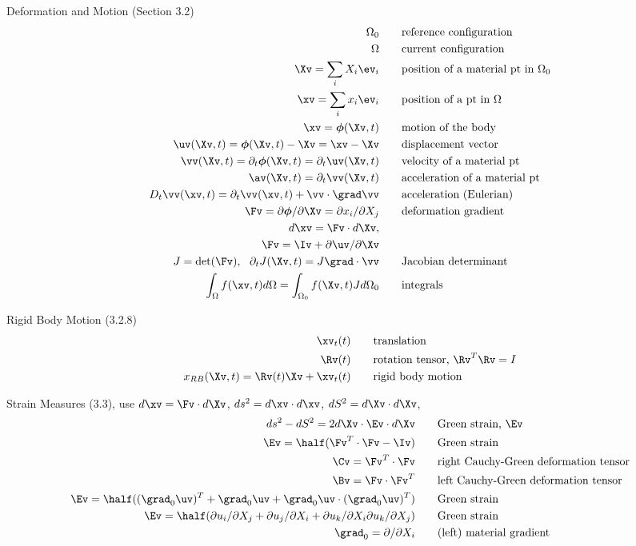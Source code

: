 \documentclass[11pt]{article}
\newcommand{\phiv}{\boldsymbol{\phi}}
\begin{document}
Deformation and Motion (Section 3.2)
\begin{align}
  \Omega_0 & \qquad \mbox{reference configuration} \\
  \Omega   & \qquad \mbox{current configuration} \\
  \Xv=\sum_i X_i \ev_i & \qquad \mbox{position of a material pt in $\Omega_0$} \\
  \xv=\sum_i x_i \ev_i & \qquad \mbox{position of a pt in $\Omega$} \\
  \xv=\phiv(\Xv,t) & \qquad \mbox{motion of the body} \\
  \uv(\Xv,t) =\phiv(\Xv,t)-\Xv = \xv-\Xv &\qquad \mbox{displacement vector} \\
  \vv(\Xv,t) = \partial_t \phiv(\Xv,t) = \partial_t \uv(\Xv,t) &\qquad \mbox{velocity of a material pt} \\
  \av(\Xv,t) = \partial_t \vv(\Xv,t)  &\qquad \mbox{acceleration of a material pt} \\
  D_t \vv(\xv,t) = \partial_t \vv(\xv,t) + \vv\cdot\grad \vv &\qquad \mbox{acceleration (Eulerian)} \\
  \Fv = \partial \phiv/\partial \Xv = \partial x_i/ \partial X_j  &\qquad \mbox{deformation gradient} \\
  d\xv = \Fv \cdot d\Xv , & \\
  ~\Fv = \Iv + \partial \uv/\partial \Xv  & \\
  J = \det(\Fv),~~ \partial_t J(\Xv,t) = J \grad\cdot\vv  &\qquad \mbox{Jacobian determinant} \\
  \int_\Omega f(\xv,t)d\Omega = \int_{\Omega_0} f(\Xv,t) J d\Omega_0 &\qquad \mbox{integrals} 
\end{align}


Rigid Body Motion (3.2.8)
\begin{align}
  \xv_t(t) & \qquad \mbox{translation} \\
  \Rv(t) & \qquad \mbox{rotation tensor, $\Rv^T\Rv = I$} \\
  x_{RB}(\Xv,t) = \Rv(t) \Xv + \xv_t(t) & \qquad \mbox{rigid body motion} 
\end{align}

Strain Measures (3.3), use $d\xv = \Fv \cdot d\Xv$, $ds^2=d\xv\cdot d\xv$, $dS^2=d\Xv\cdot d\Xv$, 
\begin{align}
  ds^2 - dS^2 = 2 d\Xv \cdot \Ev \cdot d\Xv & \qquad \mbox{Green strain, $\Ev$} \\
  \Ev = \half(\Fv^T \cdot \Fv - \Iv) & \qquad \mbox{Green strain} \\
  \Cv = \Fv^T \cdot \Fv & \qquad \mbox{right Cauchy-Green deformation tensor} \\
  \Bv = \Fv \cdot \Fv^T & \qquad \mbox{left Cauchy-Green deformation tensor} \\
  \Ev = \half((\grad_0\uv)^T + \grad_0\uv + \grad_0\uv\cdot(\grad_0\uv)^T) & \qquad \mbox{Green strain} \\
  \Ev = \half( \partial u_i/ \partial X_j +  \partial u_j/ \partial X_i 
                       + \partial u_k/ \partial X_i \partial u_k/ \partial X_j) & \qquad \mbox{Green strain} \\
  \grad_0 = \partial/\partial X_i & \qquad \mbox{(left) material gradient}
\end{align}
\end{document}
